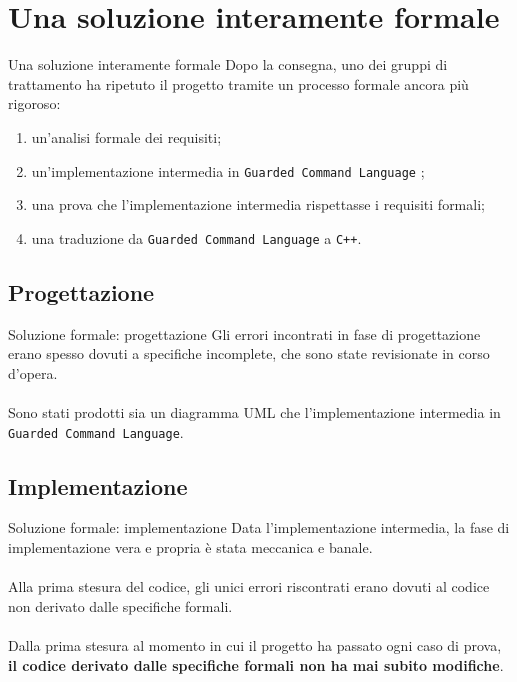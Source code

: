 \documentclass{beamer}
\begin{document}
\section{Una soluzione interamente formale}

\begin{frame}{Una soluzione interamente formale}
	Dopo la consegna, uno dei gruppi di trattamento ha ripetuto il progetto
	tramite un processo formale ancora più rigoroso:
	\begin{enumerate}
		\item un'analisi formale dei requisiti;
		\item un'implementazione intermedia in \texttt{Guarded Command Language}
		      ;
		\item una prova che l'implementazione intermedia rispettasse i requisiti
		      formali;
		\item una traduzione da \texttt{Guarded Command Language} a \texttt{C++}.
	\end{enumerate}
\end{frame}

\subsection{Progettazione}
\begin{frame}{Soluzione formale: progettazione}
	Gli errori incontrati in fase di progettazione erano spesso dovuti a
	specifiche incomplete, che sono state revisionate in corso d'opera.
	\\~\\
	Sono stati prodotti sia un diagramma UML che l'implementazione intermedia in
	\texttt{Guarded Command Language}.
\end{frame}

\subsection{Implementazione}
\begin{frame}{Soluzione formale: implementazione}
	Data l'implementazione intermedia, la fase di implementazione vera e propria
	è stata meccanica e banale.
	\\~\\
	Alla prima stesura del codice, gli unici errori riscontrati erano dovuti al
	codice non derivato dalle specifiche formali.
	\\~\\
	Dalla prima stesura al momento in cui il progetto ha passato ogni caso di
	prova, \textbf{il codice derivato dalle specifiche formali non ha mai subito
		modifiche}.
\end{frame}
\end{document}
